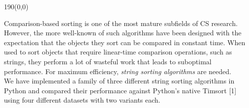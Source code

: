 \begin{textblock}{190}(0,0)
\begin{multicols}{2}
\sffamily
\small 
Comparison-based sorting is one of the most mature subfields of CS research.
However, the more well-known of such algorithms have been designed with the
expectation that the objects they sort can be compared in constant time.
When used to sort objects that require linear-time comparison operations,
such as strings, they perform a lot of wasteful work that leads to suboptimal
performance. For maximum efficiency, \emph{string sorting algorithms} are
needed.\\
We have implemented a family of three different string sorting algorithms in
Python and compared their performance against Python's native Timsort [1] using
four different datasets with two variants each.
\end{multicols}
\end{textblock}
